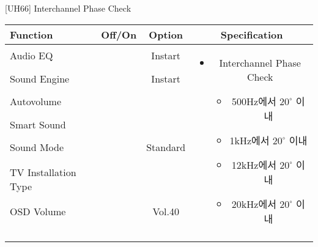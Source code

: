 \begin{frame}[t]{[UH66] Interchannel Phase Check}
\begin{tiny}
\begin{tabular}{@{}lccc@{}}
\toprule
Function & Off/On & Option & Specification \\
\midrule
Audio EQ & \color{black}{Off} & Instart &
\multirow{10}{60mm}{
\begin{itemize}
\item Interchannel Phase Check
	\begin{itemize}
	\item 500Hz에서 \(20^\circ\) 이내
	\item 1kHz에서 \(20^\circ\) 이내
	\item 12kHz에서 \(20^\circ\) 이내
	\item 20kHz에서 \(20^\circ\) 이내
	\end{itemize}
\end{itemize}
} \\
Sound Engine & \color{black}{Off} & Instart & \\
Autovolume & \color{black}{Off} & & \\
Smart Sound & \color{black}{Off} & & \\
Sound Mode & \color{blue}{On} & Standard & \\
TV Installation Type & \color{blue}{On} & \color{black}{Standtype1} & \\
OSD Volume & \color{blue}{On} & Vol.40 & \\
& & & \\
& & & \\
& & & \\
& & & \\
\midrule
\end{tabular}
\end{tiny}

\end{frame}
